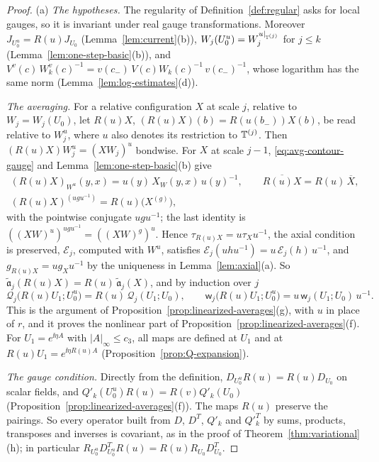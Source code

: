\begin{proof}
(a) \emph{The hypotheses.} The regularity of Definition~\ref{def:regular} asks for local gauges, so it is invariant under real gauge transformations. Moreover $J_{U_0^u}=R(u)J_{U_0}$ (Lemma~\ref{lem:current}(b)), $W_j(U_0^u)=W_j^{u|_{\mathbb T^{(j)}}}$ for $j\le k$ (Lemma~\ref{lem:one-step-basic}(b)), and $V^v(c)\,W_k^v(c)^{-1}=v(c_-)\,V(c)W_k(c)^{-1}\,v(c_-)^{-1}$, whose logarithm has the same norm (Lemma~\ref{lem:log-estimates}(d)).

\emph{The averaging.} For a relative configuration $X$ at scale $j$, relative to $W_j=W_j(U_0)$, let $R(u)X$, $(R(u)X)(b)=R(u(b_-))X(b)$, be read relative to $W_j^u$, where $u$ also denotes its restriction to $\mathbb T^{(j)}$. Then $(R(u)X)W_j^u=(XW_j)^u$ bondwise. For $X$ at scale $j-1$, \eqref{eq:avg-contour-gauge} and Lemma~\ref{lem:one-step-basic}(b) give
\[
\begin{gathered}
(R(u)X)_{W^u}(y,x)=u(y)\,X_W(y,x)\,u(y)^{-1},\qquad\overline{R(u)X}=R(u)\,\overline X,\\
(R(u)X)^{(ugu^{-1})}=R(u)\big(X^{(g)}\big),
\end{gathered}
\]
with the pointwise conjugate $ugu^{-1}$; the last identity is $((XW)^u)^{ugu^{-1}}=((XW)^g)^u$. Hence $\tau_{R(u)X}=u\tau_Xu^{-1}$, the axial condition is preserved, $\mathcal E_j$, computed with $W^u$, satisfies $\mathcal E_j(uhu^{-1})=u\,\mathcal E_j(h)\,u^{-1}$, and $g_{R(u)X}=ug_Xu^{-1}$ by the uniqueness in Lemma~\ref{lem:axial}(a). So $\tilde{\mathfrak a}_j(R(u)X)=R(u)\,\tilde{\mathfrak a}_j(X)$, and by induction over $j$
\[
\mathcal Q_j\big(R(u)U_1;U_0^u\big)=R(u)\,\mathcal Q_j(U_1;U_0),\qquad\mathsf w_j\big(R(u)U_1;U_0^u\big)=u\,\mathsf w_j(U_1;U_0)\,u^{-1}.
\]
This is the argument of Proposition~\ref{prop:linearized-averages}(g), with $u$ in place of $r$, and it proves the nonlinear part of Proposition~\ref{prop:linearized-averages}(f). For $U_1=e^{\ii\eta A}$ with $|A|_\infty\le c_3$, all maps are defined at $U_1$ and at $R(u)U_1=e^{\ii\eta R(u)A}$ (Proposition~\ref{prop:Q-expansion}).

\emph{The gauge condition.} Directly from the definition, $D_{U_0^u}R(u)=R(u)D_{U_0}$ on scalar fields, and $Q'_k(U_0^u)R(u)=R(v)Q'_k(U_0)$ (Proposition~\ref{prop:linearized-averages}(f)). The maps $R(u)$ preserve the pairings. So every operator built from $D$, $D^T$, $Q'_k$ and $Q'^T_k$ by sums, products, transposes and inverses is covariant, as in the proof of Theorem~\ref{thm:variational}(h); in particular $R_{U_0^u}D^T_{U_0^u}R(u)=R(u)R_{U_0}D^T_{U_0}$.


\end{proof}
